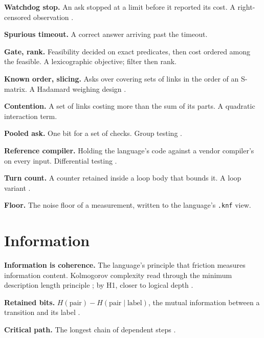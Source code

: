 \noindent\textbf{Watchdog stop.} An ask stopped at a limit before it reported its cost. A
right-censored observation \cite{src:Kaplan-Meier}.

\noindent\textbf{Spurious timeout.} A correct answer arriving past the timeout.

\noindent\textbf{Gate, rank.} Feasibility decided on exact predicates, then cost ordered among the
feasible. A lexicographic objective; filter then rank.

\noindent\textbf{Known order, slicing.} Asks over covering sets of links in the order of an
S-matrix. A Hadamard weighing design \cite{src:Hotelling, src:Sloane-Harwit}.

\noindent\textbf{Contention.} A set of links costing more than the sum of its parts. A quadratic
interaction term.

\noindent\textbf{Pooled ask.} One bit for a set of checks. Group testing
\cite{src:Dorfman, src:Ungar}.

\noindent\textbf{Reference compiler.} Holding the language's code against a vendor compiler's on
every input. Differential testing \cite{src:McKeeman}.

\noindent\textbf{Turn count.} A counter retained inside a loop body that bounds it. A loop variant
\cite{src:Floyd}.

\noindent\textbf{Floor.} The noise floor of a measurement, written to the language's
\texttt{.knf} view.

\section{Information}

\noindent\textbf{Information is coherence.} The language's principle that friction measures
information content. Kolmogorov complexity \cite{src:Kolmogorov} read through the minimum
description length principle \cite{src:Rissanen}; by H1, closer to logical depth
\cite{src:Bennett}.

\noindent\textbf{Retained bits.} \(H(\text{pair}) - H(\text{pair}\mid\text{label})\), the mutual
information between a transition and its label \cite{src:Shannon}.

\noindent\textbf{Critical path.} The longest chain of dependent steps \cite{src:Kelley-Walker}.
